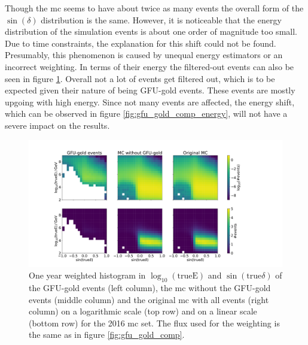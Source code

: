 Though the mc seems to have about twice as many events the overall form of the $\sin{(\delta)}$ distribution is the same.
However, it is noticeable that the energy distribution of the simulation events is about one order of magnitude too small.
Due to time constraints, the explanation for this shift could not be found.
Presumably, this phenomenon is caused by unequal energy estimators or an incorrect weighting.
In terms of their energy the filtered-out events can also be seen in figure \ref{fig:energy}.
Overall not a lot of events get filtered out, which is to be expected given their nature of being GFU-gold events.
These events are mostly upgoing with high energy.
Since not many events are affected, the energy shift, which can be observed in figure \ref{fig:gfu_gold_comp_energy}, will not have a severe impact on the results.
\begin{figure}
    \centering
    \includegraphics[width=16cm]{Plots/03_data/cleaned_mc_energy_test.pdf}
    \caption{One year weighted histogram in $\log_{10}(\text{trueE})$ and $\sin{(\text{true}\delta)}$ of the GFU-gold events (left column), the mc without the GFU-gold events (middle column) and the original mc with all events (right column) on a logarithmic scale (top row) and on a linear scale (bottom row) for the 2016 mc set. The flux used for the weighting is the same as in figure \ref{fig:gfu_gold_comp}.}
    \label{fig:energy}
\end{figure}
